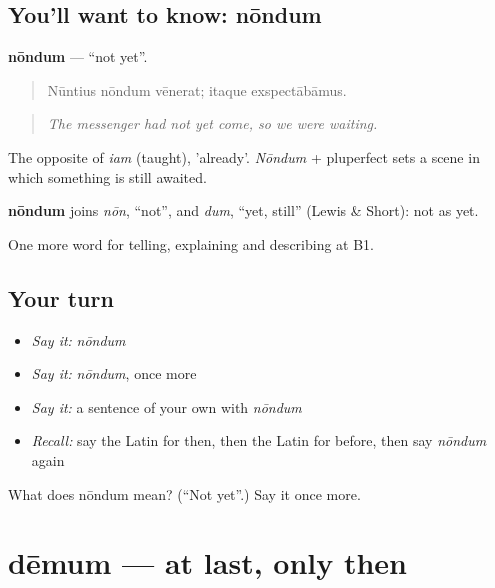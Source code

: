 \subsection*{You'll want to know: nōndum}
\textbf{nōndum} — \textquotedblleft{}not yet\textquotedblright{}.

\begin{quote}
Nūntius nōndum vēnerat; itaque exspectābāmus.
\end{quote}

\begin{quote}
\emph{The messenger had not yet come, so we were waiting.}
\end{quote}

The opposite of \emph{iam} (taught), 'already'. \emph{Nōndum} + pluperfect sets a scene in which something is still awaited.

\begin{cousinweb}
\textbf{nōndum} joins \emph{nōn}, \textquotedblleft{}not\textquotedblright{}, and \emph{dum}, \textquotedblleft{}yet, still\textquotedblright{} (Lewis \& Short): not as yet.
\end{cousinweb}

\begin{grammarlens}[title={What you've built}]
One more word for telling, explaining and describing at B1.
\end{grammarlens}

\subsection*{Your turn}
\begin{itemize}
\raggedright
  \item \emph{Say it:} \emph{nōndum}
  \item \emph{Say it:} \emph{nōndum}, once more
  \item \emph{Say it:} a sentence of your own with \emph{nōndum}
  \item \emph{Recall:} say the Latin for then, then the Latin for before, then say \emph{nōndum} again
\end{itemize}

\begin{tcolorbox}[breakable,colback=teal!4,colframe=teal!35!black,title={Before you move on}]
What does nōndum mean? (\textquotedblleft{}Not yet\textquotedblright{}.) Say it once more.
\end{tcolorbox}
\section[dēmum]{dēmum — at last, only then}

